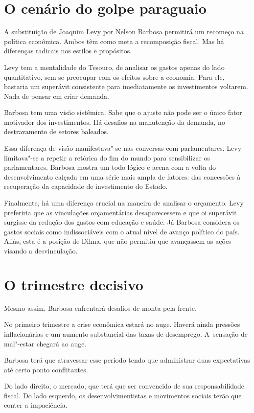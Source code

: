 \section{O cenário do golpe paraguaio}

A substituição de Joaquim Levy por Nelson Barbosa permitirá um recomeço
na política econômica. Ambos têm como meta a recomposição fiscal. Mas há
diferenças radicais nos estilos e propósitos.

Levy tem a mentalidade do Tesouro, de analisar os gastos apenas do lado
quantitativo, sem se preocupar com os efeitos sobre a economia. Para
ele, bastaria um superávit consistente para imediatamente os
investimentos voltarem. Nada de pensar em criar demanda.

Barbosa tem uma visão sistêmica. Sabe que o ajuste não pode ser o único
fator motivador dos investimentos. Há desafios na manutenção da demanda,
no destravamento de setores baleados.

Essa diferença de visão manifestava"-se nas conversas com parlamentares.
Levy limitava"-se a repetir a retórica do fim do mundo para sensibilizar
os parlamentares. Barbosa mostra um todo lógico e acena com a volta do
desenvolvimento calçada em uma série mais ampla de fatores: das
concessões à recuperação da capacidade de investimento do Estado.

Finalmente, há uma diferença crucial na maneira de analisar o orçamento.
Levy preferiria que as vinculações orçamentárias desaparecessem e que oi
superávit surgisse da redução dos gastos com educação e saúde. Já
Barbosa considera os gastos sociais como indissociáveis com o atual
nível de avanço político do país. Aliás, esta é a posição de Dilma, que
não permitiu que avançassem as ações visando a desvinculação.

\section{O trimestre decisivo}

Mesmo assim, Barbosa enfrentará desafios de monta pela frente.

No primeiro trimestre a crise econômica estará no auge. Haverá ainda
pressões inflacionárias e um aumento substancial das taxas de
desemprego. A~sensação de mal"-estar chegará ao auge.

Barbosa terá que atravessar esse período tendo que administrar duas
expectativas até certo ponto conflitantes.

Do lado direito, o mercado, que terá que ser convencido de sua
responsabilidade fiscal. Do lado esquerdo, os desenvolvimentistas e
movimentos sociais terão que conter a impaciência.

